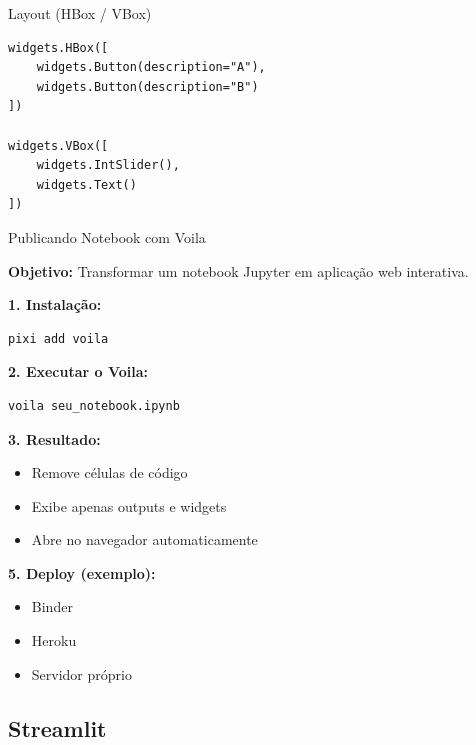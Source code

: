 \documentclass{beamer}
\begin{document}
\begin{frame}[fragile]{Layout (HBox / VBox)}

\begin{verbatim}
widgets.HBox([
    widgets.Button(description="A"),
    widgets.Button(description="B")
])

widgets.VBox([
    widgets.IntSlider(),
    widgets.Text()
])
\end{verbatim}

\end{frame}

\begin{frame}[fragile]{Publicando Notebook com Voila}

\textbf{Objetivo:} Transformar um notebook Jupyter em aplicação web interativa.

\vspace{0.3cm}

\textbf{1. Instalação:}
\begin{verbatim}
pixi add voila
\end{verbatim}

\vspace{0.3cm}

\textbf{2. Executar o Voila:}
\begin{verbatim}
voila seu_notebook.ipynb
\end{verbatim}

\vspace{0.3cm}

\textbf{3. Resultado:}
\begin{itemize}
    \item Remove células de código
    \item Exibe apenas outputs e widgets
    \item Abre no navegador automaticamente
\end{itemize}

\vspace{0.3cm}

\textbf{5. Deploy (exemplo):}
\begin{itemize}
    \item Binder
    \item Heroku
    \item Servidor próprio
\end{itemize}

\end{frame}

\subsection{Streamlit}
\end{document}
